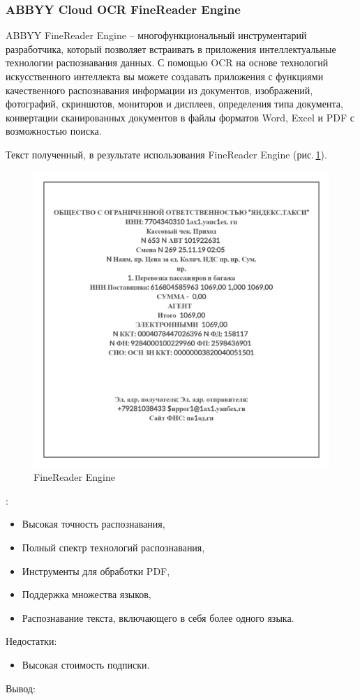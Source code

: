 \documentclass[14pt]{mmcs_article}
\begin{document}
\subsubsection{ABBYY Cloud OCR FineReader Engine} 
 
ABBYY FineReader Engine – многофункциональный инструментарий разработчика, который позволяет встраивать в приложения интеллектуальные технологии распознавания данных. С помощью OCR на основе технологий искусственного интеллекта вы можете создавать приложения с функциями качественного распознавания информации из документов, изображений, фотографий, скриншотов, мониторов и дисплеев, определения типа документа, конвертации сканированных документов в файлы форматов Word, Excel и PDF с возможностью поиска.

Текст полученный, в результате использования FineReader Engine (рис.\,\ref{stud:fig:3}).
\begin{figure}[H]
  \centering
  \includegraphics[scale=0.35]{test3.png}
  \caption{FineReader Engine}\label{stud:fig:3}
\end{figure}
:
\begin{itemize}
\item Высокая точность распознавания,
\item Полный спектр технологий распознавания,
\item Инструменты для обработки PDF,
\item Поддержка множества языков,
\item Распознавание текста, включающего в себя более одного языка.
\end{itemize}
Недостатки:
\begin{itemize}
\item Высокая стоимость подписки.
\end{itemize}
Вывод:
\end{document}
